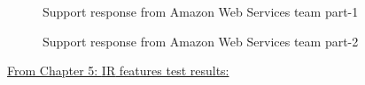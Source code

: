 \begin {figure}[ht]
    \centering
    \caption{Support response from Amazon Web Services team part-1}
    \label{awssupportresp1}
\end {figure}

\begin{figure}[h!h]
  \centering
  \caption{Support response from Amazon Web Services team part-2}
  \label{awssupportresp2}
\end{figure}
\clearpage

\newpage
\underline{From Chapter 5: \acs{IR} features test results:}
